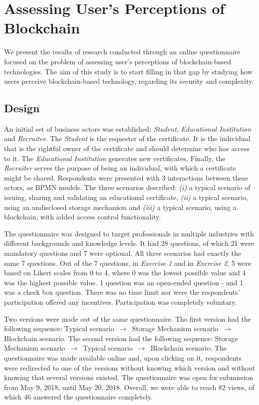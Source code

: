 \section{Assessing User's Perceptions of Blockchain}

We present the results of research conducted through an online questionnaire focused on the problem of assessing user's perceptions of blockchain-based technologies. The aim of this study is to start filling in that gap by studying how users perceive blockchain-based technology, regarding its security and complexity.

\subsection{Design}

An initial set of business actors was established: \textit{Student}, \textit{Educational Institution} and \textit{Recruiter}. The \textit{Student} is the requester of the certificate. It is the individual that is the rightful owner of the certificate and should determine who has access to it. The \textit{Educational Institution} generates new certificates. Finally, the \textit{Recruiter} serves the purpose of being an individual, with which a certificate might be shared. Respondents were presented with 3 interactions between these actors, as BPMN \cite{BPMN} models. The three scenarios described: \emph{(i)} a typical scenario of issuing, sharing and validating an educational certificate, \emph{(ii)} a typical scenario, using an undisclosed storage mechanism and \emph{(iii)} a typical scenario, using a blockchain, with added access control functionality.

The questionnaire was designed to target professionals in multiple industries with different backgrounds and knowledge levels. It had 28 questions, of which 21 were mandatory questions and 7 were optional. All three scenarios had exactly the same 7 questions. Out of the 7 questions, in \textit{Exercise 1} and in \textit{Exercise 2}, 5 were based on Likert scales from 0 to 4, where 0 was the lowest possible value and 4 was the highest possible value. 1 question was an open-ended question - and 1 was a check box question. There was no time limit nor were the respondents' participation offered any incentives. Participation was completely voluntary. 

Two versions were made out of the same questionnaire. The first version had the following sequence: Typical scenario $\,\to\,$ Storage Mechanism scenario $\,\to\,$ Blockchain scenario. The second version had the following sequence: Storage Mechanism scenario $\,\to\,$ Typical scenario $\,\to\,$ Blockchain scenario. The questionnaire was made available online and, upon clicking on it, respondents were redirected to one of the versions without knowing which version and without knowing that several versions existed. The questionnaire was open for submission from May 9, 2018, until May 20, 2018. Overall, we were able to reach 82 views, of which 46 answered the questionnaire completely. 


